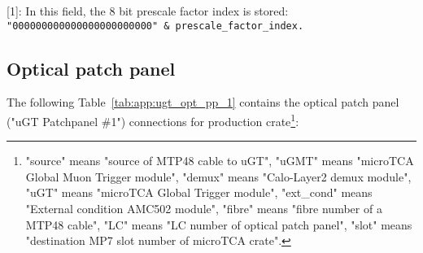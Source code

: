 [1]: In this field, the 8 bit prescale factor index is stored:\\
\texttt{\small{"000000000000000000000000" \& prescale\_factor\_index.}}\\

\clearpage

\subsection{Optical patch panel}\label{sec:app:app_d}

The following Table~\ref{tab:app:ugt_opt_pp_1} contains the optical patch panel ("uGT Patchpanel \#1") connections for production crate\footnote{"source" means "source of MTP48 cable to uGT", "uGMT" means "microTCA Global Muon Trigger module", "demux" means "Calo-Layer2 demux module", "uGT" means "microTCA Global Trigger module", "ext\_cond" means "External condition AMC502 module", "fibre" means "fibre number of a MTP48 cable", "LC" means "LC number of optical patch panel", "slot" means "destination MP7 slot number of microTCA crate".\label{note_ugt_opt_pp_1}}:

